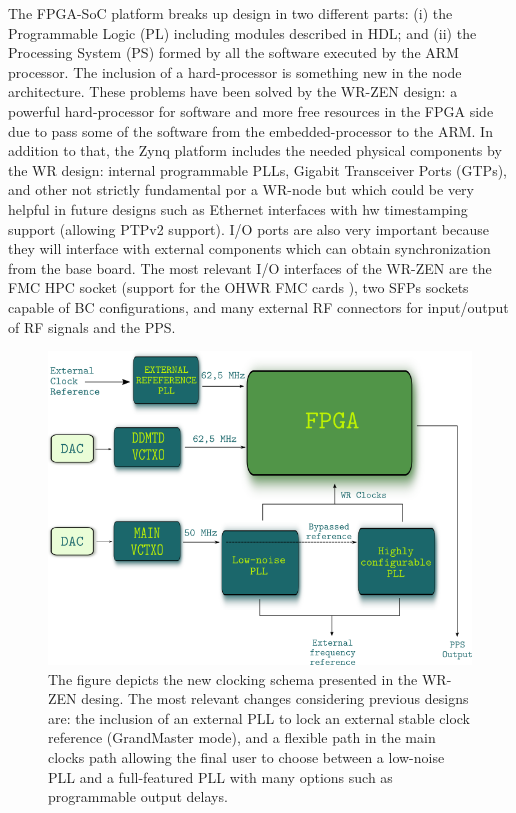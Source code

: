 The FPGA-SoC platform breaks up design in two different parts: (i) the 
Programmable Logic (PL) including modules described in HDL; and (ii) the 
Processing System (PS) formed by all the software executed by the ARM processor.
The inclusion of a hard-processor is something new in the node architecture.
These problems have been solved by the WR-ZEN design: a 
powerful hard-processor for software and more free resources in the FPGA side 
due to pass some of the software from the embedded-processor to the ARM. In 
addition to that, the Zynq platform includes the needed physical components by 
the WR design: internal programmable PLLs, Gigabit Transceiver Ports (GTPs), 
and other not strictly fundamental por a WR-node but which could be very 
helpful in future designs such as Ethernet interfaces with hw timestamping 
support (allowing PTPv2 support). I/O ports are also very important because 
they will interface with external components which can obtain synchronization 
from the base board. The most relevant I/O interfaces of the WR-ZEN are the FMC 
HPC socket (support for the OHWR \cite{ohwr:repo} FMC cards 
\cite{ohwr:fmc-fine-delay}), two SFPs sockets capable of BC configurations, and 
many external RF connectors for input/output of RF signals and the PPS.

\begin{figure}
	\centering
	\includegraphics[width=0.7\linewidth]{img/zenclkschema}
	\caption[WR-ZEN clocking schema]{The figure depicts the new clocking schema 
		presented in the WR-ZEN desing. The most relevant changes considering 
		previous designs are: the inclusion of an external PLL to lock an 
		external 
		stable clock reference (GrandMaster mode), and a flexible path in the 
		main 
		clocks path allowing the final user to choose between a low-noise PLL 
		and a 
		full-featured PLL with many options such as programmable output delays.}
	\label{fig:zenclkschema}
\end{figure}

